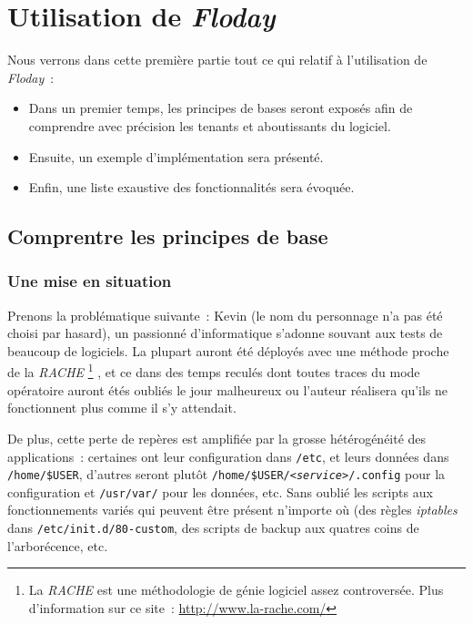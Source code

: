\section{Utilisation de \emph{Floday}}

\begin{intro}
	Nous verrons dans cette première partie tout ce qui relatif à l'utilisation de \emph{Floday}~:
	\begin{itemize}
		\item Dans un premier temps, les principes de bases seront exposés afin de comprendre avec précision les tenants et aboutissants du logiciel.
		\item Ensuite, un exemple d'implémentation sera présenté.
		\item Enfin, une liste exaustive des fonctionnalités sera évoquée.
	\end{itemize}
\end{intro}

\subsection{Comprentre les principes de base}

\subsubsection{Une mise en situation}

Prenons la problématique suivante~:
Kevin (le nom du personnage n'a pas été choisi par hasard), un passionné d'informatique s'adonne souvant aux tests de beaucoup de logiciels.
La plupart auront été déployés avec une méthode proche de la \emph{RACHE}%
\footnote{La \emph{RACHE} est une méthodologie de génie logiciel assez controversée. Plus d'information sur ce site~: \url{http://www.la-rache.com/}}%
, et ce dans des temps reculés dont toutes traces du mode opératoire auront étés oubliés le jour malheureux ou l'auteur réalisera qu'ils ne fonctionnent plus comme il s'y attendait.

De plus, cette perte de repères est amplifiée par la grosse hétérogénéité des applications~: certaines ont leur configuration dans {\tt/etc}, et leurs données dans {\tt/home/\$USER}, d'autres seront plutôt {\tt/home/\$USER/\emph{<service>}/.config} pour la configuration et {\tt/usr/var/} pour les données, etc.
Sans oublié les scripts aux fonctionnements variés qui peuvent être présent n'importe où (des règles \emph{iptables} dans {\tt/etc/init.d/80-custom}, des scripts de backup aux quatres coins de l'arborécence, etc.

